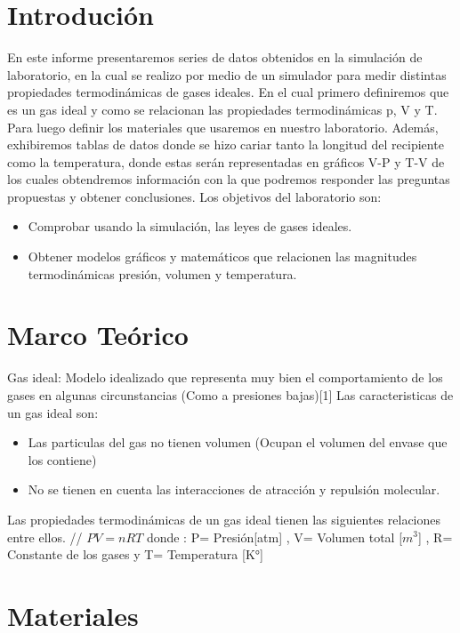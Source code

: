 \documentclass[]{article}
\begin{document}
\section{Introdución}
En este informe presentaremos series de datos obtenidos en la simulación de laboratorio, en la cual se realizo por medio de un simulador para medir distintas propiedades termodinámicas de gases ideales.
En el cual primero definiremos que es un gas ideal y como se relacionan las propiedades termodinámicas p, V y T. Para luego definir los materiales que usaremos en nuestro laboratorio.
Además, exhibiremos tablas de datos donde se hizo cariar tanto la longitud del recipiente como la temperatura, donde estas serán representadas en gráficos V-P y T-V de los cuales obtendremos información con la que podremos responder las preguntas propuestas y obtener conclusiones.
Los objetivos del laboratorio son:
      \begin{itemize}  %
            \item Comprobar usando la simulación, las leyes de gases ideales.
            \item Obtener modelos gráficos y matemáticos que relacionen las magnitudes termodinámicas presión,
            volumen y temperatura.
      \end{itemize}


\section{Marco Teórico}
Gas ideal: Modelo idealizado que representa muy bien el comportamiento 
de los gases en algunas circunstancias (Como a presiones bajas)[1]
Las caracteristicas de un gas ideal son:
\begin{itemize}
      \item Las particulas del gas no tienen volumen (Ocupan el volumen del envase que los contiene)
      \item No se tienen en cuenta las interacciones de atracción y repulsión molecular.
\end{itemize}

Las propiedades termodinámicas de un gas ideal tienen las siguientes relaciones entre ellos. //
$PV=nRT$
donde :
P= Presión[atm]   , V= Volumen total [$m^3$] , R= Constante de los gases  y  T= Temperatura [K°]



\section{Materiales}
\end{document}
